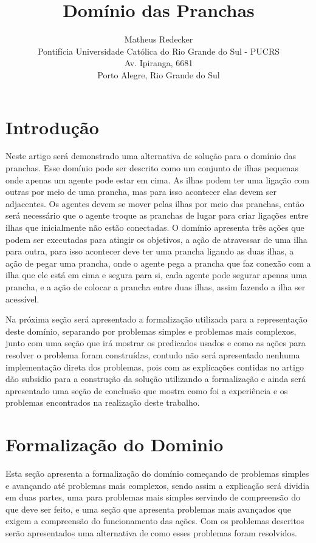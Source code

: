 \documentclass[letterpaper]{article}
\begin{document}
 \nocopyright
%
\title{ Domínio das Pranchas }
\author{Matheus Redecker\\
Pontifícia Universidade Católica do Rio Grande do Sul - PUCRS\\
Av. Ipiranga, 6681 \\
Porto Alegre, Rio Grande do Sul\\
}
\maketitle

\section{Introdução}
Neste artigo será demonstrado uma alternativa de solução para o domínio das pranchas. Esse domínio pode ser descrito como um conjunto de ilhas pequenas onde apenas um agente pode estar em cima. As ilhas podem ter uma ligação com outras por meio de uma prancha, mas para isso acontecer elas devem ser adjacentes. Os agentes devem se mover pelas ilhas por meio das pranchas, então será necessário que o agente troque as pranchas de lugar para criar ligações entre ilhas que inicialmente não estão conectadas. O domínio apresenta três ações que podem ser executadas para atingir os objetivos, a ação de atravessar de uma ilha para outra, para isso acontecer deve ter uma prancha ligando as duas ilhas, a ação de pegar uma prancha, onde o agente pega a prancha que faz conexão com a ilha que ele está em cima e segura para si, cada agente pode segurar apenas uma prancha, e a ação de colocar a prancha entre duas ilhas, assim fazendo a ilha ser acessível. 

Na próxima seção será apresentado a formalização utilizada para a representação deste domínio, separando por problemas simples e problemas mais complexos, junto com uma seção que irá mostrar os predicados usados e como as ações para resolver o problema foram construídas, contudo não será apresentado nenhuma implementação direta dos problemas, pois com as explicações contidas no artigo dão subsidio para a construção da solução utilizando a formalização e ainda será apresentado uma seção de conclusão que mostra como foi a experiência e os problemas encontrados na realização deste trabalho.

\section{Formalização do Dominio}
Esta seção apresenta a formalização do domínio começando de problemas simples e avançando até problemas mais complexos, sendo assim a explicação será dividia em duas partes, uma para problemas mais simples servindo de compreensão do que deve ser feito, e uma seção que apresenta problemas mais avançados que exigem a compreensão do funcionamento das ações. Com os problemas descritos serão apresentados uma alternativa de como esses problemas foram resolvidos.
\end{document}
